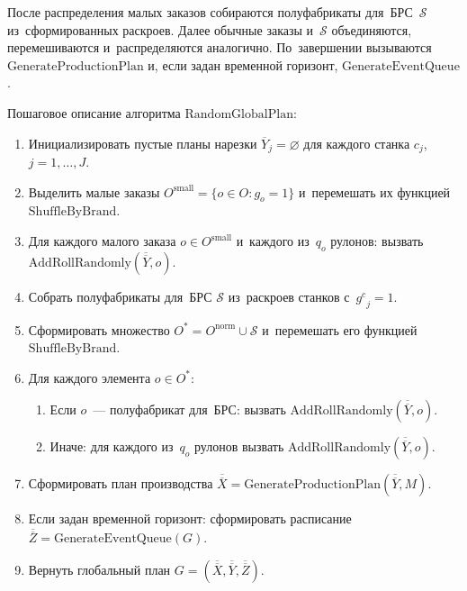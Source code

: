 После распределения малых заказов собираются полуфабрикаты для~БРС~$\mathcal{S}$ из~сформированных раскроев.
Далее обычные заказы и~$\mathcal{S}$ объединяются, перемешиваются и~распределяются аналогично.
По~завершении вызываются $\mathrm{GenerateProductionPlan}$ и, если задан временной горизонт, $\mathrm{GenerateEventQueue}$.
\begin{center}
\resizebox{!}{0.8\textheight}{%
    
}
\label{alg:random_global_plan}
\end{center}

Пошаговое описание алгоритма $\mathrm{RandomGlobalPlan}$:
\begin{enumerate}
  \item Инициализировать пустые планы нарезки $\overline{Y}_j=\varnothing$ для каждого станка $c_j$, $j=1,\ldots,J$.
  \item Выделить малые заказы $O^{\mathrm{small}}=\{o\in O:g_o=1\}$ и~перемешать их функцией $\mathrm{ShuffleByBrand}$.
  \item Для каждого малого заказа $o\in O^{\mathrm{small}}$ и~каждого из~$q_o$ рулонов: вызвать $\mathrm{AddRollRandomly}(\overline{\overline{Y}},o)$.
  \item Собрать полуфабрикаты для~БРС $\mathcal{S}$ из~раскроев станков с~${g^c}_j=1$.
  \item Сформировать множество $O^*=O^{\mathrm{norm}}\cup\mathcal{S}$ и~перемешать его функцией $\mathrm{ShuffleByBrand}$.
  \item Для каждого элемента $o\in O^*$:
  \begin{enumerate}
    \item Если $o$~--- полуфабрикат для~БРС: вызвать $\mathrm{AddRollRandomly}(\overline{\overline{Y}},o)$.
    \item Иначе: для каждого из~$q_o$ рулонов вызвать $\mathrm{AddRollRandomly}(\overline{\overline{Y}},o)$.
  \end{enumerate}
  \item Сформировать план производства $\overline{\overline{X}}=\mathrm{GenerateProductionPlan}(\overline{\overline{Y}},M)$.
  \item Если задан временной горизонт: сформировать расписание $\overline{\overline{Z}}=\mathrm{GenerateEventQueue}(G)$.
  \item Вернуть глобальный план $G=(\overline{\overline{X}},\overline{\overline{Y}},\overline{\overline{Z}})$.
\end{enumerate}


